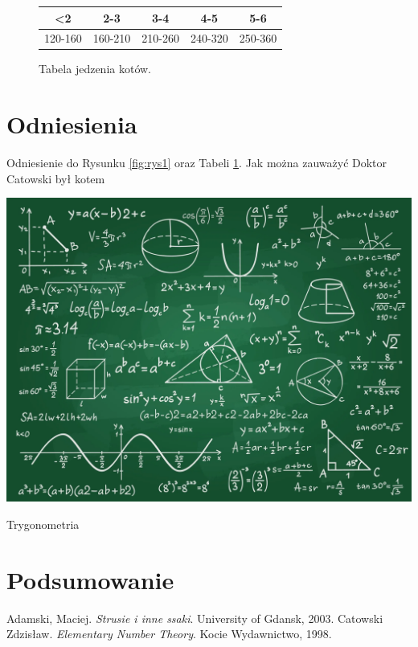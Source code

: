 \documentclass{article}
\begin{document}
\lipsum[2]

\begin{figure}[h]
    \centering
    \begin{tabular}{|c|c|c|c|c|}
        \hline
        <2 & 2-3 & 3-4 & 4-5 & 5-6 \\
        \hline
        120-160 & 160-210 & 210-260 & 240-320 & 250-360 \\
        \hline
    \end{tabular}
    \caption{Tabela jedzenia kotów.}
    \label{tab:tabela1}
\end{figure}

\section{Odniesienia}

Odniesienie do Rysunku \ref{fig:rys1} oraz Tabeli \ref{tab:tabela1}. Jak można zauważyć Doktor Catowski był kotem

\centering
    \begin{minipage}{0.4\textwidth}
        \includegraphics[width=\linewidth]{image1.png}
        \label{fig:rys2}
    \end{minipage}
    \hspace{0.05\textwidth}
    \begin{minipage}{0.5\textwidth}
        Trygonometria
    \end{minipage}

\section{Podsumowanie}

\lipsum[2]

\begin{thebibliography}{9}
     Adamski, Maciej. \emph{Strusie i inne ssaki}. University of Gdansk, 2003.
     Catowski Zdzisław. \emph{Elementary Number Theory}. Kocie Wydawnictwo, 1998.
\end{thebibliography}
\end{document}
